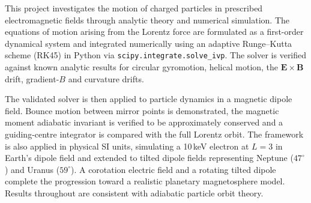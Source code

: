 This project investigates the motion of charged particles in prescribed electromagnetic fields through analytic theory and numerical simulation. The equations of motion arising from the Lorentz force are formulated as a first-order dynamical system and integrated numerically using an adaptive Runge--Kutta scheme (RK45) in Python via \texttt{scipy.integrate.solve\_ivp}. The solver is verified against known analytic results for circular gyromotion, helical motion, the $\mathbf{E} \times \mathbf{B}$ drift, gradient-$B$ and curvature drifts.

The validated solver is then applied to particle dynamics in a magnetic dipole field. Bounce motion between mirror points is demonstrated, the magnetic moment adiabatic invariant is verified to be approximately conserved and a guiding-centre integrator is compared with the full Lorentz orbit. The framework is also applied in physical SI units, simulating a 10\,keV electron at $L = 3$ in Earth's dipole field and extended to tilted dipole fields representing Neptune ($47^\circ$) and Uranus ($59^\circ$). A corotation electric field and a rotating tilted dipole complete the progression toward a realistic planetary magnetosphere model. Results throughout are consistent with adiabatic particle orbit theory.